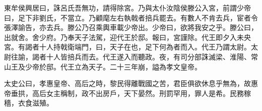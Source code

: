 東牟侯興居曰，誅呂氏吾無功，請得除宮。乃與太仆汝陰侯滕公入宮，前謂少帝曰，足下非劉氏，不當立。乃顧麾左右執戟者掊兵罷去。有數人不肯去兵，宦者令張澤諭告，亦去兵。滕公乃召乘輿車載少帝出。少帝曰，欲將我安之乎。滕公曰，出就舍。舍少府。乃奉天子法駕，迎代王於邸。報曰，宮謹除。代王即夕入未央宮。有謁者十人持戟衛端門，曰，天子在也，足下何為者而入。代王乃謂太尉。太尉往諭，謁者十人皆掊兵而去。代王遂入而聽政。夜，有司分部誅滅梁、淮陽、常山王及少帝於邸。代王立為天子。二十三年崩，謚為孝文皇帝。

太史公曰，孝惠皇帝、高后之時，黎民得離戰國之苦，君臣俱欲休息乎無為，故惠帝垂拱，高后女主稱制，政不出房戶，天下晏然。刑罰罕用，罪人是希。民務稼穡，衣食滋殖。